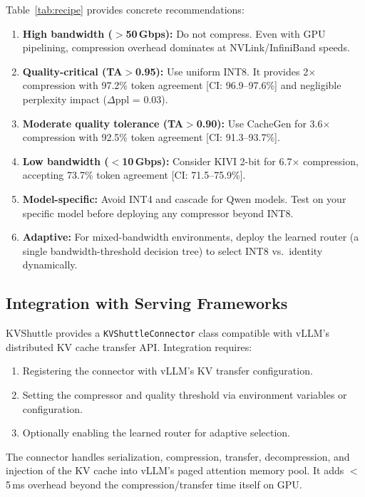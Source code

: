 \documentclass{article}
\begin{document}
Table~\ref{tab:recipe} provides concrete recommendations:

\begin{enumerate}    \item \textbf{High bandwidth ($>$50\,Gbps):} Do not compress. Even with GPU pipelining, compression overhead dominates at NVLink/InfiniBand speeds.
    \item \textbf{Quality-critical (TA$>$0.95):} Use uniform INT8. It provides 2$\times$ compression with 97.2\% token agreement [CI: 96.9--97.6\%] and negligible perplexity impact ($\Delta$ppl = 0.03).
    \item \textbf{Moderate quality tolerance (TA$>$0.90):} Use CacheGen for 3.6$\times$ compression with 92.5\% token agreement [CI: 91.3--93.7\%].
    \item \textbf{Low bandwidth ($<$10\,Gbps):} Consider KIVI 2-bit for 6.7$\times$ compression, accepting 73.7\% token agreement [CI: 71.5--75.9\%].
    \item \textbf{Model-specific:} Avoid INT4 and cascade for Qwen models. Test on your specific model before deploying any compressor beyond INT8.
    \item \textbf{Adaptive:} For mixed-bandwidth environments, deploy the learned router (a single bandwidth-threshold decision tree) to select INT8 vs.\ identity dynamically.
\end{enumerate}

\subsection{Integration with Serving Frameworks}

KVShuttle provides a \texttt{KVShuttleConnector} class compatible with vLLM's distributed KV cache transfer API. Integration requires:
\begin{enumerate}    \item Registering the connector with vLLM's KV transfer configuration.
    \item Setting the compressor and quality threshold via environment variables or configuration.
    \item Optionally enabling the learned router for adaptive selection.
\end{enumerate}
The connector handles serialization, compression, transfer, decompression, and injection of the KV cache into vLLM's paged attention memory pool. It adds $<$5\,ms overhead beyond the compression/transfer time itself on GPU.
\end{document}
